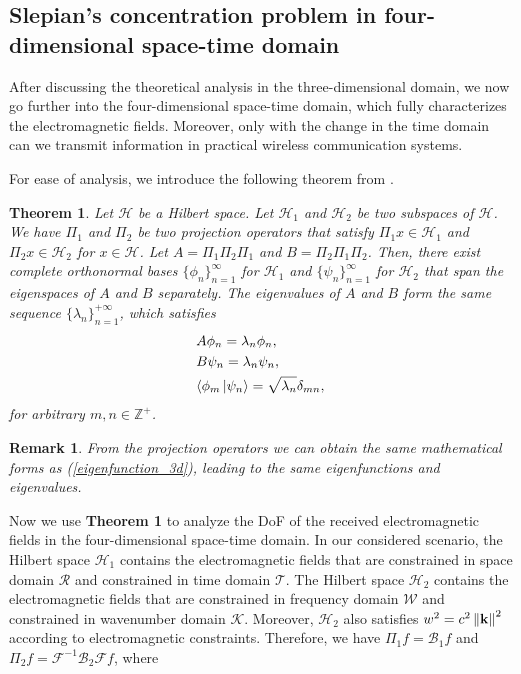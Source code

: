 \documentclass[12pt,draftclsnofoot,journal,onecolumn]{IEEEtran}
\newtheorem{theorem}{Theorem}
\newtheorem{remark}{Remark}
\begin{document}
	\subsection{Slepian's concentration problem in four-dimensional space-time domain}
	
	After discussing the theoretical analysis in the three-dimensional domain, we now go further into the four-dimensional space-time domain, which fully characterizes the electromagnetic fields. Moreover, only with the change in the time domain can we transmit information in practical wireless communication systems.
	
	For ease of analysis, we introduce the following theorem from \cite{ihara1993information}.
	
	\begin{theorem}
		\cite{ihara1993information} Let $\mathcal{H}$ be a Hilbert space. Let $\mathcal{H}_1$ and $\mathcal{H}_2$ be two subspaces of $\mathcal{H}$. We have $\Pi_1$ and $\Pi_2$ be two projection operators that satisfy $\Pi_1 x \in \mathcal{H}_1$ and $\Pi_2 x \in \mathcal{H}_2$ for $x \in \mathcal{H}$. Let $A = \Pi_1 \Pi_2 \Pi_1$ and $B = \Pi_2 \Pi_1 \Pi_2$. Then, there exist complete orthonormal bases $\{\phi_n \}_{n=1}^{\infty}$ for $\mathcal{H}_1$ and $\{\psi_n \}_{n=1}^{\infty}$ for $\mathcal{H}_2$ that span the eigenspaces of $A$ and $B$ separately. The eigenvalues of $A$ and $B$ form the same sequence $\{\lambda_n \}_{n=1}^{+\infty}$, which satisfies
		\begin{subequations}
			\begin{align} 
				&A\phi_n = \lambda_n \phi_n, \label{Aphi}\\
				& B \psi_n = \lambda_n \psi_n,  \label{Bpsi}\\
				& \langle \phi_m \ket{\psi_n} = \sqrt{\lambda_n} \delta_{mn},
			\end{align}
		\end{subequations}
		for arbitrary $m,n\in \mathbb{Z}^+$.
	\end{theorem}
	\begin{remark}
		From the projection operators we can obtain the same mathematical forms as (\ref{eigenfunction_3d}), leading to the same eigenfunctions and eigenvalues. 
	\end{remark}
	Now we use {\bf Theorem 1} to analyze the DoF of the received electromagnetic fields in the four-dimensional space-time domain. In our considered scenario, the Hilbert space $\mathcal{H}_1$ contains the electromagnetic fields that are constrained in space domain $\mathcal{R}$ and constrained in time domain $\mathcal{T}$. The Hilbert space $\mathcal{H}_2$ contains the electromagnetic fields that are constrained in frequency domain $\mathcal{W}$ and constrained in wavenumber domain $\mathcal{K}$. Moreover, $\mathcal{H}_2$ also satisfies $w^2 = c^2\left\| {\bf k} \right\|^2 $ according to electromagnetic constraints. Therefore, we have $\Pi_1f = \mathcal{B}_1 f $ and $\Pi_2 f = \mathcal{F}^{-1} \mathcal{B}_2 \mathcal{F} f$, where 
\end{document}
